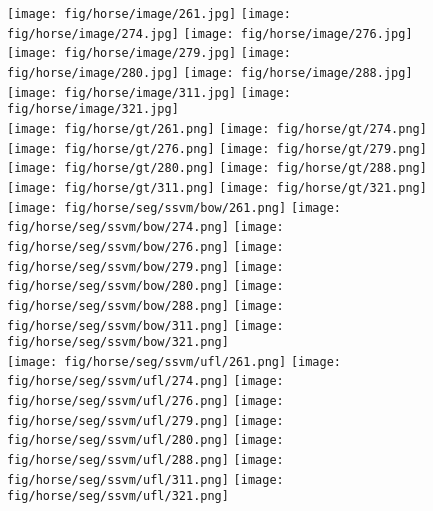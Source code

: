 \documentclass[10pt,3p]{elsarticle}
\begin{document}
\begin{figure}[t]
\centering
    \texttt{[image: fig/horse/image/261.jpg]}
     \texttt{[image: fig/horse/image/274.jpg]}
     \texttt{[image: fig/horse/image/276.jpg]}       
	\texttt{[image: fig/horse/image/279.jpg]}                  
    \texttt{[image: fig/horse/image/280.jpg]}
     \texttt{[image: fig/horse/image/288.jpg]}  
     \texttt{[image: fig/horse/image/311.jpg]}   
     \texttt{[image: fig/horse/image/321.jpg]} \\
     
     \texttt{[image: fig/horse/gt/261.png]}
     \texttt{[image: fig/horse/gt/274.png]}
     \texttt{[image: fig/horse/gt/276.png]}       
	\texttt{[image: fig/horse/gt/279.png]}                  
    \texttt{[image: fig/horse/gt/280.png]}
     \texttt{[image: fig/horse/gt/288.png]}  
     \texttt{[image: fig/horse/gt/311.png]}   
     \texttt{[image: fig/horse/gt/321.png]} \\
     
     
     \texttt{[image: fig/horse/seg/ssvm/bow/261.png]}
     \texttt{[image: fig/horse/seg/ssvm/bow/274.png]}
     \texttt{[image: fig/horse/seg/ssvm/bow/276.png]}       
	\texttt{[image: fig/horse/seg/ssvm/bow/279.png]}                  
    \texttt{[image: fig/horse/seg/ssvm/bow/280.png]}
     \texttt{[image: fig/horse/seg/ssvm/bow/288.png]}  
     \texttt{[image: fig/horse/seg/ssvm/bow/311.png]}   
     \texttt{[image: fig/horse/seg/ssvm/bow/321.png]} \\
     
     \texttt{[image: fig/horse/seg/ssvm/ufl/261.png]}
     \texttt{[image: fig/horse/seg/ssvm/ufl/274.png]}
     \texttt{[image: fig/horse/seg/ssvm/ufl/276.png]}       
	\texttt{[image: fig/horse/seg/ssvm/ufl/279.png]}                  
    \texttt{[image: fig/horse/seg/ssvm/ufl/280.png]}
     \texttt{[image: fig/horse/seg/ssvm/ufl/288.png]}  
     \texttt{[image: fig/horse/seg/ssvm/ufl/311.png]}   
     \texttt{[image: fig/horse/seg/ssvm/ufl/321.png]} \\
     

\end{figure}
\end{document}

